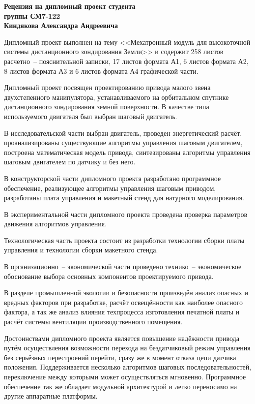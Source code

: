 \documentclass[a4paper, 11pt]{article}
\newcommand\studentnameheader{Киндякова Александра Андреевича}
\begin{document}

\begin{center}
    {\large \textbf{Рецензия на дипломный проект студента \\ группы СМ7-122 \\ \studentnameheader}}
\end{center}

Дипломный проект выполнен на тему <<Мехатронный модуль для высокоточной системы
дистанционного зондирования Земли>> и содержит 258 листов расчетно~-- пояснительной
записки, 17 листов формата А1, 6 листов формата А2, 8 листов формата А3 и 6 листов
формата А4 графической части.

Дипломный проект посвящен проектированию привода малого звена двухстепенного
манипулятора, устанавливаемого на орбитальном спутнике дистанционного зондирования
земной поверхности. В качестве типа используемого двигателя был выбран шаговый
двигатель.

В исследовательской части выбран двигатель, проведен энергетический расчёт,
проанализированы существующие алгоритмы управления шаговым двигателем,
построена математическая модель привода, синтезированы алгоритмы управления
шаговым двигателем по датчику и без него.

В конструкторской части дипломного проекта разработано программное обеспечение,
реализующее алгоритмы управления шаговым приводом, разработаны плата управления
и макетный стенд для натурного моделирования.

В экспериментальной части дипломного проекта проведена проверка параметров
движения алгоритмов управления.

Технологическая часть проекта состоит из разработки технологии сборки платы
управления и технологии сборки макетного стенда.

В организационно~-- экономической части проведено технико~-- экономическое
обоснование выбора основных компонентов проектируемого привода.

В разделе промышленной экологии и безопасности произведён анализ опасных и
вредных факторов при разработке, расчёт освещённости как наиболее опасного фактора,
а так же анализ влияния техпроцесса изготовления печатной платы и расчёт системы
вентиляции производственного помещения.

Достоинствами дипломного проекта является повышение надёжности привода путём
осуществления возможности перехода на бездатчиковый режим управления без
серьёзных перестроений перейти, сразу же в момент отказа цепи датчика положения.
Поддерживается несколько алгоритмов шаговых последовательностей, переключение
между которыми может осуществляться мгновенно. Программное обеспечение так же
обладает модульной архитектурой и легко переносимо на другие аппаратные платформы.
\end{document}
